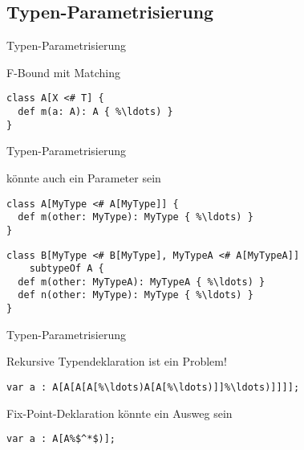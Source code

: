 \subsection{Typen-Parametrisierung}
\begin{frame}[t,fragile]{Typen-Parametrisierung}
	\begin{bigitemize}{3mm}
		\item F-Bound mit Matching
	\end{bigitemize}
\pause
\begin{lstlisting}[language=ooplss]
class A[X <# T] {
  def m(a: A): A { %\ldots) }
}
\end{lstlisting}
\end{frame}

\begin{frame}[t,fragile]{Typen-Parametrisierung}
	\begin{bigitemize}{3mm}
		\item \mytype könnte auch ein Parameter sein
	\end{bigitemize}
\pause
\begin{lstlisting}[language=ooplss]
class A[MyType <# A[MyType]] {
  def m(other: MyType): MyType { %\ldots) }
}
\end{lstlisting}
\pause
\begin{lstlisting}[language=ooplss]
class B[MyType <# B[MyType], MyTypeA <# A[MyTypeA]]
    subtypeOf A {
  def m(other: MyTypeA): MyTypeA { %\ldots) }
  def n(other: MyType): MyType { %\ldots) }
}
\end{lstlisting}
\end{frame}

\begin{frame}[t,fragile]{Typen-Parametrisierung}
	\begin{bigitemize}{3mm}
		\item Rekursive Typendeklaration ist ein Problem!
	\end{bigitemize}
\pause
\begin{lstlisting}[language=ooplss]
var a : A[A[A[A[%\ldots)A[A[%\ldots)]]%\ldots)]]]];
\end{lstlisting}
\pause

	\begin{bigitemize}{3mm}
		\item Fix-Point-Deklaration könnte ein Ausweg sein
	\end{bigitemize}
\pause
\begin{lstlisting}[language=ooplss]
var a : A[A%$^*$)];
\end{lstlisting}
\end{frame}

